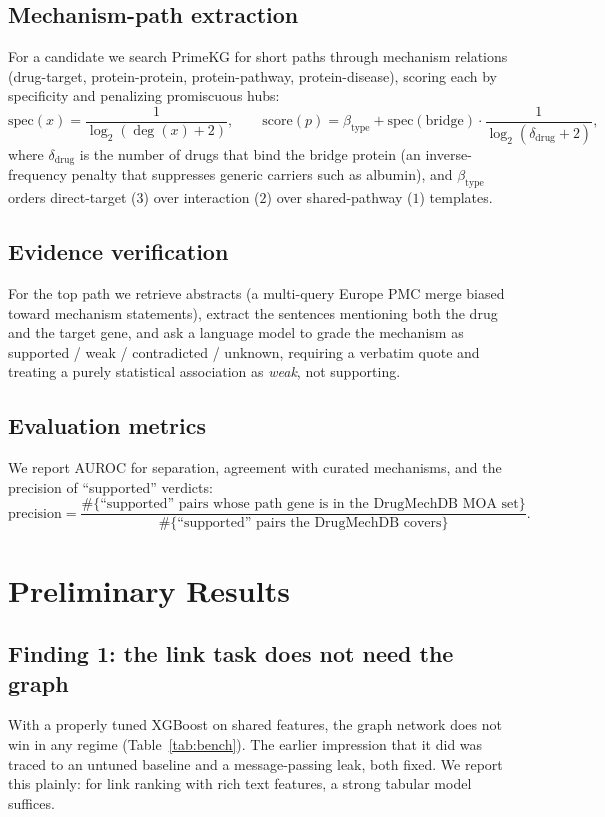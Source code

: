 \documentclass[11pt]{article}
\begin{document}
\subsection{Mechanism-path extraction}
For a candidate we search PrimeKG for short paths through mechanism relations
(drug-target, protein-protein, protein-pathway, protein-disease), scoring each by
specificity and penalizing promiscuous hubs:
\begin{equation}
\mathrm{spec}(x) = \frac{1}{\log_2(\deg(x)+2)},
\qquad
\mathrm{score}(p) = \beta_{\text{type}} + \mathrm{spec}(\text{bridge})\cdot
\frac{1}{\log_2(\delta_{\text{drug}}+2)},
\label{eq:mech}
\end{equation}
where $\delta_{\text{drug}}$ is the number of drugs that bind the bridge protein
(an inverse-frequency penalty that suppresses generic carriers such as albumin),
and $\beta_{\text{type}}$ orders direct-target ($3$) over interaction ($2$) over
shared-pathway ($1$) templates.

\subsection{Evidence verification}
For the top path we retrieve abstracts (a multi-query Europe PMC merge biased
toward mechanism statements), extract the sentences mentioning both the drug and
the target gene, and ask a language model to grade the mechanism as supported /
weak / contradicted / unknown, requiring a verbatim quote and treating a purely
statistical association as \emph{weak}, not supporting.

\subsection{Evaluation metrics}
We report AUROC for separation, agreement with curated mechanisms, and the
precision of ``supported'' verdicts:
\begin{equation}
\text{precision} =
\frac{\#\{\text{``supported'' pairs whose path gene is in the DrugMechDB MOA set}\}}
     {\#\{\text{``supported'' pairs the DrugMechDB covers}\}}.
\label{eq:prec}
\end{equation}

\section{Preliminary Results}

\subsection{Finding 1: the link task does not need the graph}
With a properly tuned XGBoost on shared features, the graph network does not win in
any regime (Table~\ref{tab:bench}). The earlier impression that it did was traced
to an untuned baseline and a message-passing leak, both fixed. We report this
plainly: for link ranking with rich text features, a strong tabular model suffices.
\end{document}
